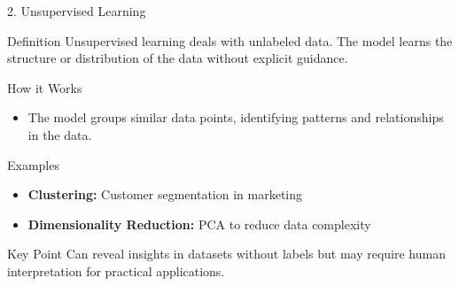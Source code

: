 \documentclass[aspectratio=169]{beamer}
\begin{document}
\begin{frame}{2. Unsupervised Learning}
    \begin{block}{Definition}
        Unsupervised learning deals with unlabeled data. The model learns the structure or distribution of the data without explicit guidance.
    \end{block}
    
    \begin{block}{How it Works}
        \begin{itemize}
            \item The model groups similar data points, identifying patterns and relationships in the data.
        \end{itemize}
    \end{block}
    
    \begin{block}{Examples}
        \begin{itemize}
            \item \textbf{Clustering:} Customer segmentation in marketing
            \item \textbf{Dimensionality Reduction:} PCA to reduce data complexity
        \end{itemize}
    \end{block}
    
    \begin{block}{Key Point}
        Can reveal insights in datasets without labels but may require human interpretation for practical applications.
    \end{block}
\end{frame}
\end{document}
